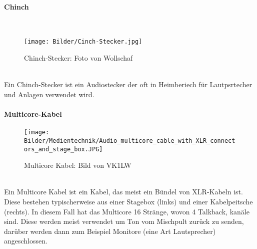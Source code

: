 \paragraph{Chinch}~\\
\begin{figure}[h]
    \centering
    \texttt{[image: Bilder/Cinch-Stecker.jpg]}
    \caption{Chinch-Stecker: Foto von Wollschaf \cite{wiki:Wollschaf}}
    \label{fig:Chinch}
\end{figure}
~\\
Ein Chinch-Stecker ist ein Audiostecker der oft in Heimberiech für Lautpsrtecher und Anlagen verwendet wird. \cite{dewiki:Chinch}



\paragraph{Multicore-Kabel}
\begin{figure}[h]
    \centering
    \texttt{[image: Bilder/Medientechnik/Audio\_multicore\_cable\_with\_XLR\_connectors\_and\_stage\_box.JPG]}
    \caption{Multicore Kabel: Bild von VK1LW \cite{wiki:VK1LW}}
    \label{fig:Multicore}
\end{figure}~\\
Ein Multicore Kabel ist ein Kabel, das meist ein Bündel von XLR-Kabeln ist. Diese bestehen typischerweise aus einer Stagebox (links) und einer Kabelpeitsche (rechts). In diesem Fall hat das Multicore 16 Stränge, wovon 4 Talkback, kanäle sind. Diese werden meist verwendet um Ton vom Mischpult zurück zu senden, darüber werden dann zum Beispiel Monitore (eine Art Lautsprecher) angeschlossen. \newpage

